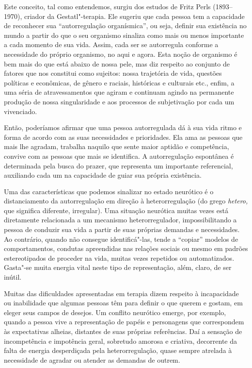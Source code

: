 Este conceito, tal como entendemos, surgiu dos estudos de Fritz Perls
(1893--1970), criador da Gestatl"-terapia. Ele sugeriu que cada pessoa tem
a capacidade de reconhecer sua ``autorregulação organísmica'', ou seja,
definir sua existência no mundo a partir do que o seu organismo sinaliza
como mais ou menos importante a cada momento de sua vida. Assim, cada
ser se autorregula conforme a necessidade do próprio organismo, no aqui
e agora. Esta noção de organismo é bem mais do que está abaixo de nossa
pele, mas diz respeito ao conjunto de fatores que nos constitui como
sujeitos: nossa trajetória de vida, questões políticas e econômicas, de
gênero e raciais, históricas e culturais etc., enfim, a uma séria de
atravessamentos que agiram e continuam agindo na permanente produção de
nossa singularidade e aos processos de subjetivação por cada um
vivenciado.

Então, poderíamos afirmar que uma pessoa autorregulada dá à sua vida
ritmo e forma de acordo com as suas necessidades e prioridades. Ela ama
as pessoas que mais lhe agradam, trabalha naquilo que sente maior
aptidão e competência, convive com as pessoas que mais se identifica. A
autorregulação espontânea é determinada pela busca do prazer, que
representa um importante referencial, auxiliando cada um na capacidade
de guiar sua própria existência.

Uma das características que podemos sinalizar no estado neurótico é o
distanciamento da autorregulação em direção à heterorregulação (do grego
\emph{hetero,} que significa diferente, irregular). Uma situação
neurótica muitas vezes está diretamente relacionada a um mecanismo
heterorregulador, impossibilitando a pessoa de conduzir sua vida a
partir de suas próprias demandas e necessidades. Ao contrário, quando
não consegue identificá"-las, tende a ``copiar'' modelos de
comportamentos, condutas apreendidas nas relações sociais ou mesmo em
padrões estereotipados de proceder na vida, muitas vezes repetidos ou
automatizados. Gasta"-se muita energia vital neste tipo de representação,
além, claro, de ser inútil.

Muitas das dificuldades apresentadas em terapia dizem respeito à
incapacidade ou inabilidade que algumas pessoas têm para definir o que
querem e gostam, em eleger seus campos de desejos. Um conflito
neurótico emerge, por exemplo, quando a pessoa vive a representação de
papéis e personagens que correspondem às expectativas alheias, distantes
de suas próprias referências. Daí a sensação de incompetência e
impotência geral, sobretudo amorosa e criativa, decorrente da falta de
energia desperdiçada pela heterorregulação, quase sempre atrelada à
necessidade de agradar ou atender as demandas de outrem.

